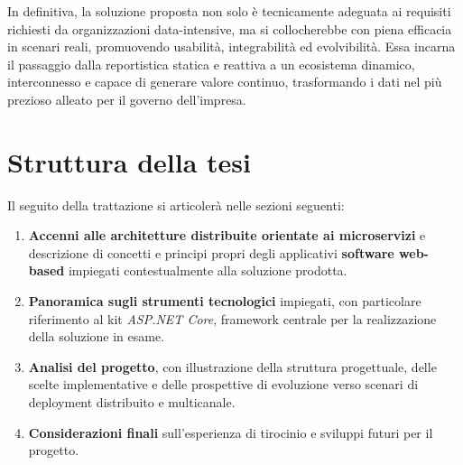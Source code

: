 In definitiva, la soluzione proposta non solo è tecnicamente adeguata ai requisiti richiesti da organizzazioni data-intensive, ma si collocherebbe con piena efficacia in scenari reali, promuovendo usabilità, integrabilità ed evolvibilità. Essa incarna il passaggio dalla reportistica statica e reattiva a un ecosistema dinamico, interconnesso e capace di generare valore continuo, trasformando i dati nel più prezioso alleato per il governo dell’impresa.

\section{Struttura della tesi}
Il seguito della trattazione si articolerà nelle sezioni seguenti:

\begin{enumerate}
	\item \textbf{Accenni alle architetture distribuite orientate ai microservizi} e descrizione di concetti e principi propri degli applicativi \textbf{software web-based} impiegati contestualmente alla soluzione prodotta.
	\item \textbf{Panoramica sugli strumenti tecnologici} impiegati, con particolare riferimento al kit \emph{ASP.NET Core}, framework centrale per la realizzazione della soluzione in esame.
	\item \textbf{Analisi del progetto}, con illustrazione della struttura progettuale, delle scelte implementative e delle prospettive di evoluzione verso scenari di deployment distribuito e multicanale.
	\item \textbf{Considerazioni finali} sull'esperienza di tirocinio e sviluppi futuri per il progetto.
\end{enumerate}